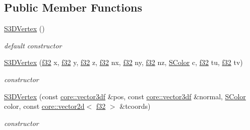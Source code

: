 \subsection*{Public Member Functions}
\begin{DoxyCompactItemize}
\item 
\mbox{\label{structirr_1_1video_1_1S3DVertex_a396baea2fe79be060fe7bd50bed81c6e}} 
\hyperlink{structirr_1_1video_1_1S3DVertex_a396baea2fe79be060fe7bd50bed81c6e}{S3\+D\+Vertex} ()
\begin{DoxyCompactList}\small\item\em default constructor \end{DoxyCompactList}\item 
\mbox{\label{structirr_1_1video_1_1S3DVertex_a90158074178ec2c180bafb47c04a763a}} 
\hyperlink{structirr_1_1video_1_1S3DVertex_a90158074178ec2c180bafb47c04a763a}{S3\+D\+Vertex} (\hyperlink{namespaceirr_a0277be98d67dc26ff93b1a6a1d086b07}{f32} x, \hyperlink{namespaceirr_a0277be98d67dc26ff93b1a6a1d086b07}{f32} y, \hyperlink{namespaceirr_a0277be98d67dc26ff93b1a6a1d086b07}{f32} z, \hyperlink{namespaceirr_a0277be98d67dc26ff93b1a6a1d086b07}{f32} nx, \hyperlink{namespaceirr_a0277be98d67dc26ff93b1a6a1d086b07}{f32} ny, \hyperlink{namespaceirr_a0277be98d67dc26ff93b1a6a1d086b07}{f32} nz, \hyperlink{classirr_1_1video_1_1SColor}{S\+Color} c, \hyperlink{namespaceirr_a0277be98d67dc26ff93b1a6a1d086b07}{f32} tu, \hyperlink{namespaceirr_a0277be98d67dc26ff93b1a6a1d086b07}{f32} tv)
\begin{DoxyCompactList}\small\item\em constructor \end{DoxyCompactList}\item 
\mbox{\label{structirr_1_1video_1_1S3DVertex_a4af08bc1db2d4dbac1c6e9f8fe1c01d0}} 
\hyperlink{structirr_1_1video_1_1S3DVertex_a4af08bc1db2d4dbac1c6e9f8fe1c01d0}{S3\+D\+Vertex} (const \hyperlink{namespaceirr_1_1core_a06f169d08b5c429f5575acb7edbad811}{core\+::vector3df} \&pos, const \hyperlink{namespaceirr_1_1core_a06f169d08b5c429f5575acb7edbad811}{core\+::vector3df} \&normal, \hyperlink{classirr_1_1video_1_1SColor}{S\+Color} color, const \hyperlink{classirr_1_1core_1_1vector2d}{core\+::vector2d}$<$ \hyperlink{namespaceirr_a0277be98d67dc26ff93b1a6a1d086b07}{f32} $>$ \&tcoords)
\begin{DoxyCompactList}\small\item\em constructor \end{DoxyCompactList}\end{DoxyCompactItemize}
